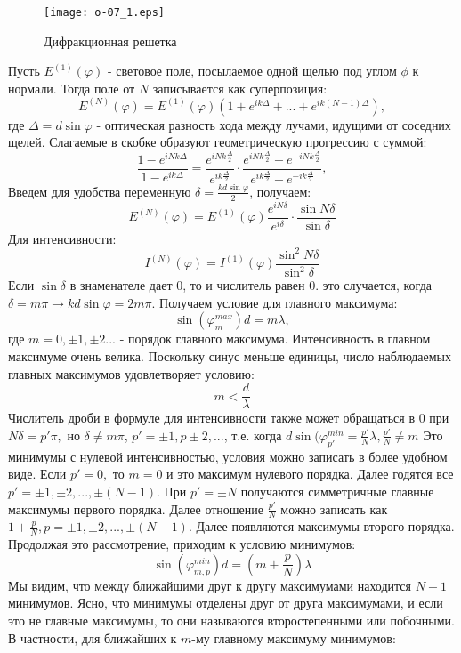 \documentclass[__main__.tex]{subfiles}
\begin{document}
\begin{figure}[h]
	\begin{center}
		\texttt{[image: o-07\_1.eps]}
		\caption{Дифракционная решетка}
	\end{center}
\end{figure}

Пусть $E^{(1)} (\varphi)$ - световое поле, посылаемое одной щелью под углом $\phi$ к нормали. Тогда поле от $N$ записывается как суперпозиция:
$$E^{(N)}(\varphi) = E^{(1)}(\varphi)(1 + e^{ik\Delta} + ... + e^{ik(N-1)\Delta}),$$
где $\Delta = d\sin \varphi$ - оптическая разность хода между лучами, идущими от соседних щелей. Слагаемые в скобке образуют геометрическую прогрессию с суммой:
$$\frac{1-e^{iNk\Delta}}{1-e^{ik\Delta}} = \frac{e^{iNk\frac{\Delta}{2}}}{e^{ik\frac{\Delta}{2}}}\cdot \frac{e^{iNk\frac{\Delta}{2}} - e^{-iNk\frac{\Delta}{2}}}{e^{ik\frac{\Delta}{2}} - e^{-ik\frac{\Delta}{2}}},$$
Введем для удобства переменную $\delta = \frac{kd\sin\varphi}{2}$, получаем:
$$E^{(N)}(\varphi) = E^{(1)}(\varphi)\frac{e^{iN\delta}}{e^{i\delta}}\cdot \frac{\sin N\delta}{\sin\delta}$$
Для интенсивности:
$$I^{(N)}(\varphi) = I^{(1)}(\varphi)\frac{\sin^2 N\delta}{\sin^2\delta}$$
Если $\sin \delta$ в знаменателе дает 0, то и числитель равен 0. это случается, когда $\delta = m\pi \rightarrow kd\sin\varphi = 2m\pi$. Получаем условие для главного максимума:
$$\sin(\varphi^{max}_m)d = m\lambda,$$
где $m = 0, \pm 1, \pm 2...$ - порядок главного максимума. Интенсивность в главном максимуме очень велика. Поскольку синус меньше единицы, число наблюдаемых главных максимумов удовлетворяет условию:
$$m < \frac{d}{\lambda}$$
Числитель дроби в формуле для интенсивности также может обращаться в 0 при $N\delta = p'\pi, $ но $\delta \neq m\pi$, $p' = \pm 1, p\pm 2, ...$, т.е. когда $d\sin(\varphi ^{min}_{p'} = \frac{p'}{N}\lambda, \frac{p'}{N} \neq m$  
Это минимумы с нулевой интенсивностью, условия можно записать в более удобном виде. Если $p' = 0, $ то $m = 0$ и это максимум нулевого порядка. Далее годятся все $p' = \pm1, \pm2, ... , \pm(N-1). $ При $p' = \pm N$ получаются симметричные главные максимумы первого порядка. Далее отношение $\frac{p'}{N}$ можно записать как $1 + \frac{p}{N}, p =  \pm1, \pm2, ... , \pm(N-1)$. Далее появляются максимумы второго порядка. Продолжая это рассмотрение, приходим к условию минимумов:
$$\sin(\varphi^{min}_{m, p})d = (m + \frac{p}{N})\lambda$$
Мы видим, что между ближайшими друг к другу максимумами находится $N - 1$ минимумов. Ясно, что минимумы отделены друг от друга максимумами, и если это не главные максимумы, то они называются второстепенными или побочными. В частности, для ближайших к $m$-му главному максимуму минимумов:
\end{document}
